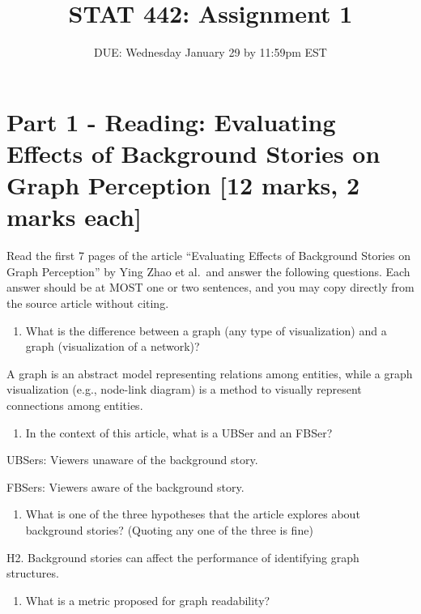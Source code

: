 \documentclass[
]{article}
\title{STAT 442: Assignment 1}
\subtitle{DUE: Wednesday January 29 by 11:59pm EST}
\author{}
\date{\vspace{-2.5em}}
\providecommand{\tightlist}{%
  \setlength{\itemsep}{0pt}\setlength{\parskip}{0pt}}
\begin{document}
\maketitle

\section{Part 1 - Reading: Evaluating Effects of Background Stories on
Graph Perception {[}12 marks, 2 marks
each{]}}\label{part-1---reading-evaluating-effects-of-background-stories-on-graph-perception-12-marks-2-marks-each}

Read the first 7 pages of the article ``Evaluating Effects of Background
Stories on Graph Perception'' by Ying Zhao et al.~and answer the
following questions. Each answer should be at MOST one or two sentences,
and you may copy directly from the source article without citing.

\begin{enumerate}
\def\labelenumi{\alph{enumi})}
\tightlist
\item
  What is the difference between a graph (any type of visualization) and
  a graph (visualization of a network)?
\end{enumerate}

A graph is an abstract model representing relations among entities,
while a graph visualization (e.g., node-link diagram) is a method to
visually represent connections among entities.

\begin{enumerate}
\def\labelenumi{\alph{enumi})}
\setcounter{enumi}{1}
\tightlist
\item
  In the context of this article, what is a UBSer and an FBSer?
\end{enumerate}

UBSers: Viewers unaware of the background story.

FBSers: Viewers aware of the background story.

\begin{enumerate}
\def\labelenumi{\alph{enumi})}
\setcounter{enumi}{2}
\tightlist
\item
  What is one of the three hypotheses that the article explores about
  background stories? (Quoting any one of the three is fine)
\end{enumerate}

H2. Background stories can affect the performance of identifying graph
structures.

\begin{enumerate}
\def\labelenumi{\alph{enumi})}
\setcounter{enumi}{3}
\tightlist
\item
  What is a metric proposed for graph readability?
\end{enumerate}
\end{document}
